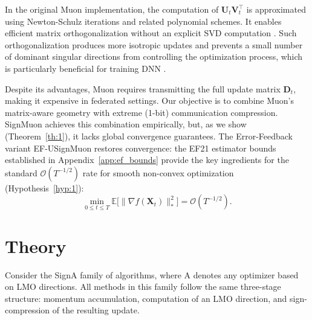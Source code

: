 \documentclass{article}
\begin{document}
In the original Muon implementation, the computation of $\mathbf{U}_t\mathbf{V}_t^\top$ is approximated using Newton-Schulz iterations and related polynomial schemes. It enables efficient matrix orthogonalization without an explicit SVD computation \cite{amsel2025polar, li2025note, liu2025muon}. Such orthogonalization produces more isotropic updates and prevents a small number of dominant singular directions from controlling the optimization process, which is particularly beneficial for training DNN \cite{bernstein2024old, shah2025practical}.

Despite its advantages, Muon requires transmitting the full update matrix $\mathbf{D}_t$, making it expensive in federated settings. Our objective is to combine Muon's matrix-aware geometry with extreme (1-bit) communication compression. SignMuon achieves this combination empirically, but, as we show (Theorem~\ref{th:1}), it lacks global convergence guarantees. The Error-Feedback variant EF-USignMuon restores convergence: the EF21 estimator bounds established in Appendix~\ref{app:ef_bounds} provide the key ingredients for the standard $\mathcal{O}(T^{-1/2})$ rate for smooth non-convex optimization (Hypothesis~\ref{hyp:1}):
\begin{equation}
\min_{0 \le t \le T}\mathbb{E}\bigl[\|\nabla f(\mathbf{X}_t)\|_*^2\bigr]
= \mathcal{O}(T^{-1/2}).
\end{equation}


\section{Theory}\label{sec:theory}
Consider the SignA family of algorithms, where A denotes any optimizer based on LMO directions. All methods in this family follow the same three-stage structure: momentum accumulation, computation of an LMO direction, and sign-compression of the resulting update.
\end{document}
